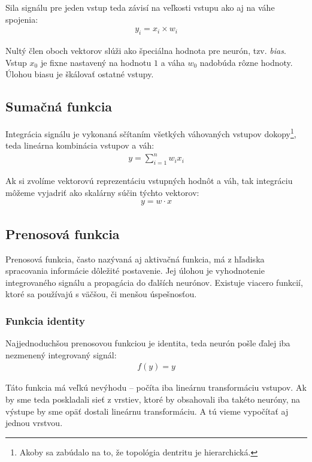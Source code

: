 Sila signálu pre jeden vstup teda závisí na veľkosti vstupu ako aj na váhe spojenia:
\begin{eqnarray}
y_i = x_i \times w_i
\end{eqnarray}

Nultý člen oboch vektorov slúži ako špeciálna hodnota pre neurón, tzv. \emph{bias}. Vstup $x_0$ je fixne nastavený na hodnotu $1$ a váha $w_0$ nadobúda rôzne hodnoty. Úlohou biasu je škálovať ostatné vstupy.

\subsection{Sumačná funkcia}

Integrácia signálu je vykonaná sčítaním všetkých váhovaných vstupov dokopy\footnote{Akoby sa zabúdalo na to, že topológia dentritu je hierarchická.}, teda lineárna kombinácia vstupov a váh:
\begin{eqnarray}
y = \sum_{i=1}^{n} w_i x_i
\end{eqnarray}

Ak si zvolíme vektorovú reprezentáciu vstupných hodnôt a váh, tak integráciu môžeme vyjadriť ako skalárny súčin týchto vektorov:
\begin{eqnarray}
y = w \cdot x
\end{eqnarray}

\subsection{Prenosová funkcia}

Prenosová funkcia, často nazývaná aj aktivačná funkcia, má z hľadiska spracovania informácie dôležité postavenie. Jej úlohou je vyhodnotenie integrovaného signálu a propagácia do ďalších neurónov. Existuje viacero funkcií, ktoré sa používajú s väčšou, či menšou úspešnosťou.

\subsubsection{Funkcia identity}

Najjednoduchšou prenosovou funkciou je identita, teda neurón pošle ďalej iba nezmenený integrovaný signál:
\begin{eqnarray}
  f(y) = y
\end{eqnarray}

Táto funkcia má veľkú nevýhodu -- počíta iba lineárnu transformáciu vstupov. Ak by sme teda poskladali sieť z vrstiev, ktoré by obsahovali iba takéto neuróny, na výstupe by sme opäť dostali lineárnu transformáciu. A tú vieme vypočítať aj jednou vrstvou.

